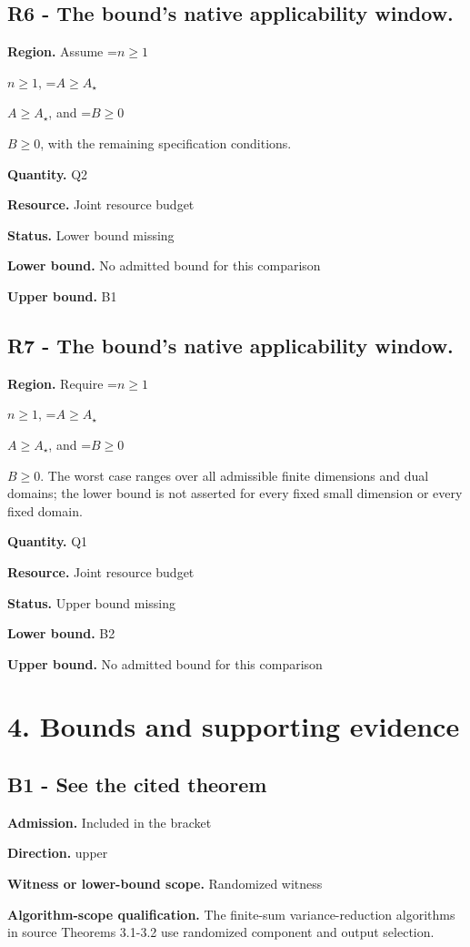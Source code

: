 \documentclass[10pt,a4paper]{article}
\newcommand{\AtlasMath}[1]{\par\begingroup\centering\setbox0=\hbox{$\displaystyle #1$}\ifdim\wd0>1.4\linewidth\typeout{ATLAS WIDE FORMULA: \the\wd0}\fi\ifdim\wd0>\linewidth\resizebox{\linewidth}{!}{\box0}\else\box0\fi\par\endgroup}
\newcommand{\AtlasInlineMath}[1]{\begingroup\setbox0=\hbox{$#1$}\ifdim\wd0>.4\linewidth\endgroup\AtlasMath{#1}\else\endgroup$#1$\fi}
\begin{document}
\subsection{R6 - The bound’s native applicability window.}
\textbf{Region.} Assume \AtlasInlineMath{n\ge1}, \AtlasInlineMath{A\ge A_\star}, and \AtlasInlineMath{B\ge0}, with the remaining specification conditions.

\textbf{Quantity.} Q2

\textbf{Resource.} Joint resource budget

\textbf{Status.} Lower bound missing

\textbf{Lower bound.} No admitted bound for this comparison

\textbf{Upper bound.} B1

\subsection{R7 - The bound’s native applicability window.}
\textbf{Region.} Require \AtlasInlineMath{n\ge1}, \AtlasInlineMath{A\ge A_\star}, and \AtlasInlineMath{B\ge0}. The worst case ranges over all admissible finite dimensions and dual domains; the lower bound is not asserted for every fixed small dimension or every fixed domain.

\textbf{Quantity.} Q1

\textbf{Resource.} Joint resource budget

\textbf{Status.} Upper bound missing

\textbf{Lower bound.} B2

\textbf{Upper bound.} No admitted bound for this comparison

\section{4. Bounds and supporting evidence}
\subsection{B1 - See the cited theorem}
\textbf{Admission.} Included in the bracket

\textbf{Direction.} upper

\textbf{Witness or lower-bound scope.} Randomized witness

\textbf{Algorithm-scope qualification.} The finite-sum variance-reduction algorithms in source Theorems 3.1-3.2 use randomized component and output selection.
\end{document}
